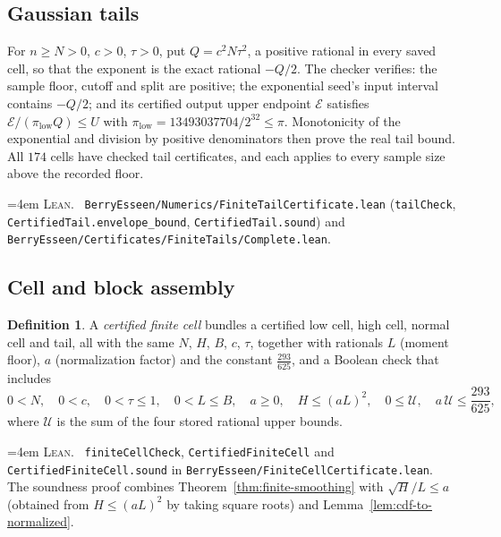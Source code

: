 \documentclass[10pt,a4paper]{article}
\theoremstyle{plain}
\theoremstyle{definition}
\newtheorem{definition}[theorem]{Definition}
\newcommand{\lean}[1]{\texttt{#1}}
\newcommand{\file}[1]{\texttt{#1}}
\newenvironment{leanref}%
  {\par\addvspace{3pt}\begingroup\sloppy\emergencystretch=4em
   \noindent\footnotesize\textsc{Lean.}\ \ignorespaces}%
  {\par\endgroup\addvspace{3pt}}
\begin{document}
\subsection{Gaussian tails}
\label{sec:finite-tails}

For $n\ge N>0$, $c>0$, $\tau>0$, put $Q=c^2N\tau^2$, a positive rational in
every saved cell, so that the exponent is the exact rational $-Q/2$. The
checker verifies: the sample floor, cutoff and split are positive; the
exponential seed's input interval contains $-Q/2$; and its certified output
upper endpoint $\mathcal E$ satisfies
$\mathcal E/(\pi_{\mathrm{low}}Q)\le U$ with
$\pi_{\mathrm{low}}=13493037704/2^{32}\le\pi$. Monotonicity of the exponential
and division by positive denominators then prove the real tail bound. All $174$
cells have checked tail certificates, and each applies to every sample size
above the recorded floor.

\begin{leanref}
\file{BerryEsseen/Numerics/FiniteTailCertificate.lean}
(\lean{tailCheck}, \lean{CertifiedTail.envelope\_bound},
\lean{CertifiedTail.sound}) and
\file{BerryEsseen/Certificates/FiniteTails/Complete.lean}.
\end{leanref}

\subsection{Cell and block assembly}

\begin{definition}\label{def:finite-cell}
A \emph{certified finite cell} bundles a certified low cell, high cell, normal
cell and tail, all with the same $N$, $H$, $B$, $c$, $\tau$, together with
rationals $L$ (moment floor), $a$ (normalization factor) and the constant
$\tfrac{293}{625}$, and a Boolean check that includes
\[
  0<N,\quad 0<c,\quad 0<\tau\le1,\quad 0<L\le B,\quad a\ge0,\quad
  H\le(aL)^2,\quad 0\le \mathcal U,\quad a\,\mathcal U\le\frac{293}{625},
\]
where $\mathcal U$ is the sum of the four stored rational upper bounds.
\end{definition}

\begin{leanref}
\lean{finiteCellCheck}, \lean{CertifiedFiniteCell} and
\lean{CertifiedFiniteCell.sound} in
\file{BerryEsseen/FiniteCellCertificate.lean}. The soundness proof combines
Theorem~\ref{thm:finite-smoothing} with $\sqrt H/L\le a$ (obtained from
$H\le(aL)^2$ by taking square roots) and Lemma~\ref{lem:cdf-to-normalized}.
\end{leanref}
\end{document}
